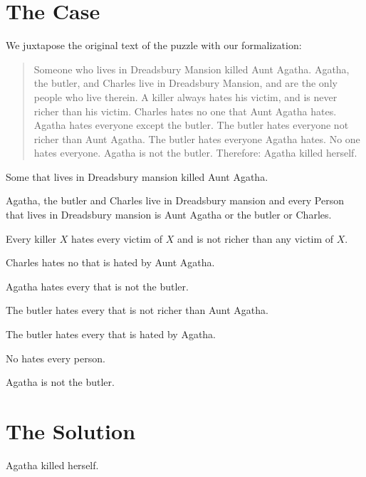 \documentclass{article}
\begin{document}
\section{The Case}

We juxtapose the original text of the puzzle with our formalization:

\begin{quotation}
Someone who lives in Dreadsbury Mansion killed Aunt Agatha.
Agatha, the butler, and Charles live in Dreadsbury Mansion, and are the only
people who live therein. A killer always hates his victim, and is never richer than
his victim. Charles hates no one that Aunt Agatha hates. Agatha hates everyone
except the butler. The butler hates everyone not richer than Aunt Agatha. The
butler hates everyone Agatha hates. No one hates everyone. Agatha is not the
butler. Therefore: Agatha killed herself.
\end{quotation}


\begin{forthel}

\begin{axiom}
Some  that lives in Dreadsbury mansion killed Aunt Agatha.
\end{axiom}

\begin{axiom}
Agatha, the butler and Charles live in Dreadsbury mansion and
every Person that lives in Dreadsbury mansion is Aunt Agatha
or the butler or Charles.
\end{axiom}

\begin{axiom}
Every killer $X$ hates every victim of $X$ and is not richer than any victim of $X$.
\end{axiom}

\begin{axiom}
Charles hates no  that is hated by Aunt Agatha.
\end{axiom}

\begin{axiom}
Agatha hates every  that is not the butler.
\end{axiom}

\begin{axiom}
The butler hates every  that is not richer than Aunt Agatha.
\end{axiom}

\begin{axiom}
The butler hates every  that is hated by Agatha.
\end{axiom}

\begin{axiom}
No  hates every person.
\end{axiom}

\begin{axiom}
Agatha is not the butler.
\end{axiom}

\end{forthel}


\section{The Solution}

\begin{forthel}

\begin{theorem}
Agatha killed herself.
\end{theorem}

\end{forthel}
\end{document}
